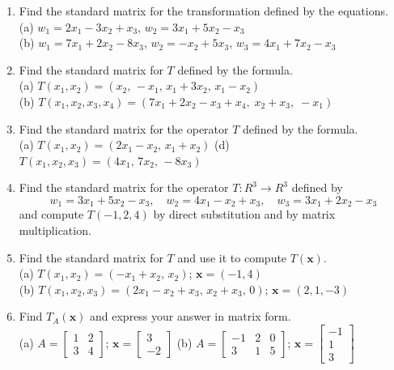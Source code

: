 \documentclass{article}
\theoremstyle{mystyle}
\begin{document}
\begin{enumerate}
\item[11.] Find the standard matrix for the transformation defined by the equations.\\
(a) $w_1=2x_1-3x_2+x_3$,\; $w_2=3x_1+5x_2-x_3$\\
(b) $w_1=7x_1+2x_2-8x_3$,\; $w_2=-x_2+5x_3$,\; $w_3=4x_1+7x_2-x_3$

\item[13.] Find the standard matrix for $T$ defined by the formula.\\
(a) $T(x_1,x_2)=(x_2,\,-x_1,\,x_1+3x_2,\,x_1-x_2)$\\
(b) $T(x_1,x_2,x_3,x_4)=(7x_1+2x_2-x_3+x_4,\;x_2+x_3,\;-x_1)$

\item[14.] Find the standard matrix for the operator $T$ defined by the formula.\\
(a) $T(x_1,x_2)=(2x_1-x_2,\,x_1+x_2)$\quad
(d) $T(x_1,x_2,x_3)=(4x_1,\,7x_2,\,-8x_3)$

\item[15.] Find the standard matrix for the operator $T:R^3\to R^3$ defined by
\[
w_1=3x_1+5x_2-x_3,\quad w_2=4x_1-x_2+x_3,\quad w_3=3x_1+2x_2-x_3
\]
and compute $T(-1,2,4)$ by direct substitution and by matrix multiplication.

\item[17.] Find the standard matrix for $T$ and use it to compute $T(\mathbf{x})$.\\
(a) $T(x_1,x_2)=(-x_1+x_2,\,x_2)$;\; $\mathbf{x}=(-1,4)$\\
(b) $T(x_1,x_2,x_3)=(2x_1-x_2+x_3,\,x_2+x_3,\,0)$;\; $\mathbf{x}=(2,1,-3)$

\item[19.] Find $T_A(\mathbf{x})$ and express your answer in matrix form.\\
(a) $A=\begin{bmatrix}1&2\\3&4\end{bmatrix}$;\; $\mathbf{x}=\begin{bmatrix}3\\-2\end{bmatrix}$\qquad
(b) $A=\begin{bmatrix}-1&2&0\\3&1&5\end{bmatrix}$;\; $\mathbf{x}=\begin{bmatrix}-1\\1\\3\end{bmatrix}$


\end{enumerate}
\end{document}
